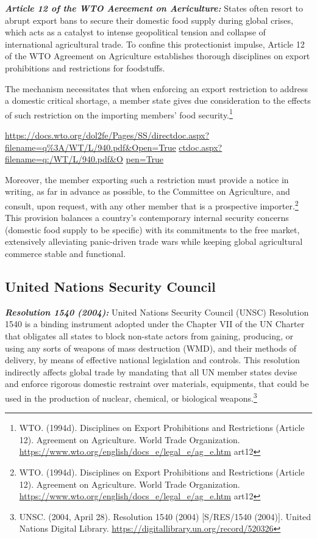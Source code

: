 \emph{\textbf{Article 12 of the WTO Aereement on Aericulture:}} States often resort to abrupt export bans to secure their domestic food supply during global crises, which acts as a catalyst to intense geopolitical tension and collapse of international agricultural trade. To confine this protectionist impulse, Article 12 of the WTO Agreement on Agriculture establishes thorough disciplines on export prohibitions and restrictions for foodstuffs.

The mechanism necessitates that when enforcing an export restriction to address a domestic critical shortage, a member state gives due consideration to the effects of such restriction on the importing  members’  food  security.\footnote{WTO. (1994d). Disciplines on Export Prohibitions and Restrictions (Article 12). Agreement on Agriculture. World Trade Organization. \url{https://www.wto.org/english/docs_e/legal_e/ag_e.htm} art12}

\url{https://docs.wto.org/dol2fe/Pages/SS/directdoc.aspx?filename=q\%3A/WT/L/940.pdf&Open=True} \href{https://docs.wto.org/dol2fe/Pages/SS/directdoc.aspx?filename=q\%3A/WT/L/940.pdf&Open=True}{ctdoc.aspx?filename=q:/WT/L/940.pdf\&O} \href{https://docs.wto.org/dol2fe/Pages/SS/directdoc.aspx?filename=q\%3A/WT/L/940.pdf&Open=True}{pen=True}

Moreover, the member exporting such a restriction must provide a notice in writing, as far in advance as possible, to the Committee on Agriculture, and consult, upon request, with any other member that is a prospective importer.\footnote{WTO. (1994d). Disciplines on Export Prohibitions and Restrictions (Article 12). Agreement on Agriculture. World Trade Organization. \url{https://www.wto.org/english/docs_e/legal_e/ag_e.htm} art12} This provision balances a country’s contemporary internal security concerns (domestic food supply to be specific) with its commitments to the free market, extensively alleviating panic-driven trade wars while keeping global agricultural commerce stable and functional.

\subsection{United Nations Security Council}

\emph{\textbf{Resolution 1540 (2004):}} United Nations Security Council (UNSC) Resolution 1540 is a binding instrument adopted under the Chapter VII of the UN Charter that obligates all states to block non-state actors from gaining, producing, or using any sorts of weapons of mass destruction (WMD), and their methods of delivery, by means of effective national legislation and controls. This resolution indirectly affects global trade by mandating that all UN member states devise and enforce rigorous domestic restraint over materials, equipments, that could be used in the production of nuclear, chemical, or biological weapons.\footnote{UNSC. (2004, April 28). Resolution 1540 (2004) [S/RES/1540 (2004)]. United Nations Digital Library. \url{https://digitallibrary.un.org/record/520326}}

